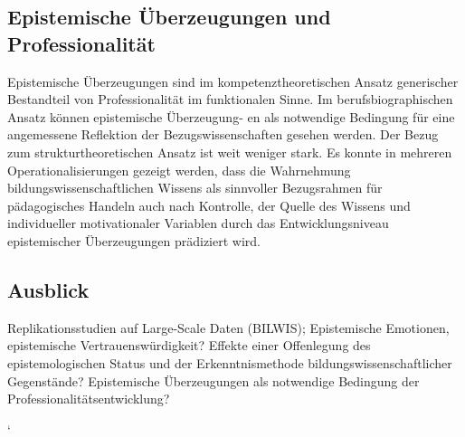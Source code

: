 \documentclass[]{tufte-handout}
\begin{document}
\subsection{Epistemische Überzeugungen und
Professionalität}\label{epistemische-uberzeugungen-und-professionalitat}

Epistemische Überzeugungen sind im kompetenztheoretischen Ansatz
generischer Bestandteil von Professionalität im funktionalen Sinne. Im
berufsbiographischen Ansatz können epistemische Überzeugung- en als
notwendige Bedingung für eine angemessene Reflektion der
Bezugswissenschaften gesehen werden. Der Bezug zum strukturtheoretischen
Ansatz ist weit weniger stark. Es konnte in mehreren
Operationalisierungen gezeigt werden, dass die Wahrnehmung
bildungswissenschaftlichen Wissens als sinnvoller Bezugsrahmen für
pädagogisches Handeln auch nach Kontrolle, der Quelle des Wissens und
individueller motivationaler Variablen durch das Entwicklungsniveau
epistemischer Überzeugungen prädiziert wird.

\subsection{Ausblick}\label{ausblick}

Replikationsstudien auf Large-Scale Daten (BILWIS); Epistemische Emotionen, 
epistemische Vertrauenswürdigkeit? Effekte einer
Offenlegung des epistemologischen Status und der Erkenntnismethode
bildungswissenschaftlicher Gegenstände? Epistemische Überzeugungen als
notwendige Bedingung der Professionalitätsentwicklung?

`


\end{document}
